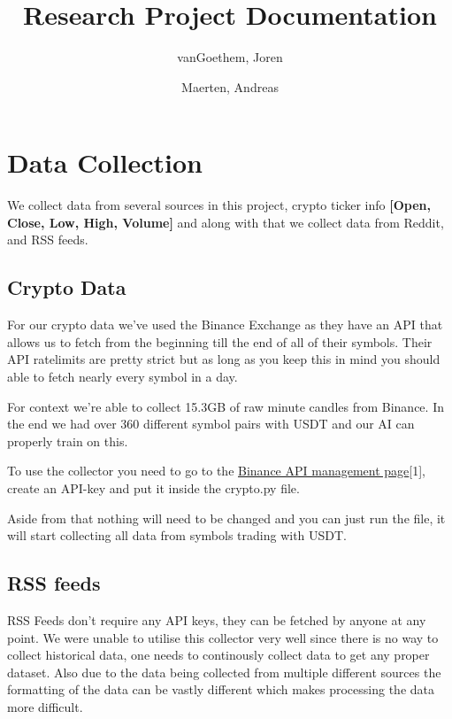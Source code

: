 \documentclass[12pt,a4paper]{article}
\begin{document}
\begin{titlepage}
    \author{
        vanGoethem, Joren
        \and
        Maerten, Andreas
    }
    \title{Research Project Documentation}
\end{titlepage}

\maketitle
\newpage
\tableofcontents
\newpage


\section{Data Collection}

We collect data from several sources in this project, crypto ticker info \textbf{[Open, Close, Low, High, Volume]} and along with that we collect data from Reddit, and RSS feeds.

\subsection{Crypto Data}

For our crypto data we've used the Binance Exchange as they have an API that allows us to fetch from the beginning till the end of all of their symbols.
Their API ratelimits are pretty strict but as long as you keep this in mind you should able to fetch nearly every symbol in a day.

For context we're able to collect 15.3GB of raw minute candles from Binance.
In the end we had over 360 different symbol pairs with USDT and our AI can properly train on this.

To use the collector you need to go to the \href{https://www.binance.com/en/my/settings/api-management}{Binance API management page}[1], create an API-key and put it inside the crypto.py file.

Aside from that nothing will need to be changed and you can just run the file, it will start collecting all data from symbols trading with USDT.

\subsection{RSS feeds}

RSS Feeds don't require any API keys, they can be fetched by anyone at any point. We were unable to utilise this collector very well since there is no way to collect historical data, one needs to continously collect data to get any proper dataset. Also due to the data being collected from multiple different sources the formatting of the data can be vastly different which makes processing the data more difficult.
\end{document}
